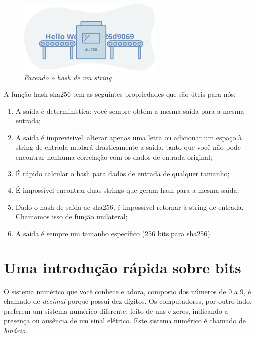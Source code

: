 \begin{figure}
  \centering
  \includegraphics[width=7cm]{imagens/hash-capitulo-04.jpg}
  \caption*{\textit{\small Fazendo o hash de um string}}
\end{figure}

A função hash sha256 tem as seguintes propriedades que são úteis para nós:

\begin{enumerate}
\item A saída é determinística: você sempre obtém a mesma saída para a mesma entrada;
\item A saída é imprevisível: alterar apenas uma letra ou adicionar um espaço à string de entrada mudará drasticamente a saída, tanto que você não pode encontrar nenhuma correlação com os dados de entrada original;
\item É rápido calcular o hash para dados de entrada de qualquer tamanho;
\item É impossível encontrar duas strings que geram hash para a mesma saída;
\item Dado o hash de saída de sha256, é impossível retornar à string de entrada. Chamamos isso de função unilateral;
\item A saída é sempre um tamanho específico (256 bits para sha256).
\end{enumerate}

\section*{Uma introdução rápida sobre bits}

O sistema numérico que você conhece e adora, composto dos números de 0 a 9, é chamado de \textit{decimal} porque possui dez dígitos. Os computadores, por outro lado, preferem um sistema numérico diferente, feito de uns e zeros, indicando a presença ou ausência de um sinal elétrico. Este sistema numérico é chamado de \textit{binário}.

